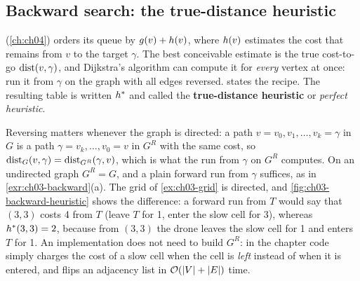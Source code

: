 \subsection{Backward search: the true-distance heuristic}
\label{sec:ch03-backward}
%
\astar (\cref{ch:ch04}) orders its queue by $g(v)+h(v)$, where $h(v)$ estimates
the cost that remains from $v$ to the target $\gamma$. The best conceivable estimate is the true
cost-to-go $\operatorname{dist}(v,\gamma)$, and Dijkstra's algorithm can compute it for \emph{every} vertex at
once: run it from $\gamma$ on the graph with all edges reversed.  states the
recipe. The resulting table is written $h^*$ and called the \textbf{true-distance
heuristic} or \emph{perfect heuristic}.

\begin{algorithm}[htb]
\caption{Backward Dijkstra: the true-distance heuristic table for a goal $\gamma$.}
\label{alg:ch03-backward}
\end{algorithm}

Reversing matters whenever the graph is directed: a path $v=v_0,v_1,\dots,v_k=\gamma$ in $G$ is a
path $\gamma=v_k,\dots,v_0=v$ in $G^{R}$ with the same cost, so $\operatorname{dist}_G(v,\gamma)=\operatorname{dist}_{G^{R}}(\gamma,v)$,
which is what the run from $\gamma$ on $G^{R}$ computes. On an undirected graph $G^{R}=G$, and a
plain forward run from $\gamma$ suffices, as in \cref{exr:ch03-backward}(a). The grid of
\cref{ex:ch03-grid} is directed, and \cref{fig:ch03-backward-heuristic} shows the difference: a
forward run from $T$ would say that $(3,3)$ costs 4 from $T$ (leave $T$ for 1, enter the slow
cell for 3), whereas $h^*(3,3)=2$, because from $(3,3)$ the drone leaves the slow cell for
1 and enters $T$ for 1. An implementation does not need to build $G^{R}$:
 in the chapter code simply charges the cost of a slow cell when the
cell is \emph{left} instead of when it is entered, and  flips an adjacency
list in $\mathcal{O}\!\left(\left\lvert V \right\rvert+\left\lvert E \right\rvert\right)$ time.

